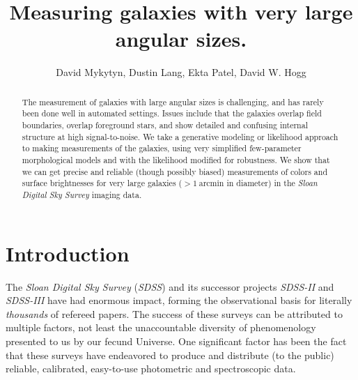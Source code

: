 \documentclass[12pt,preprint,pdftex]{aastex}
\newcounter{address}
\newcommand{\project}[1]{\textsl{#1}}
\newcommand{\units}[1]{\mathrm{#1}}
\renewcommand{\arcmin}{\units{arcmin}}
\begin{document}
\title{
       Measuring galaxies with very large angular sizes.
      }
\author{
        David Mykytyn\altaffilmark{\ref{CCPP}},
        Dustin Lang\altaffilmark{\ref{CMU}},
        Ekta Patel\altaffilmark{\ref{CCPP}},
        David W. Hogg\altaffilmark{\ref{CCPP},\ref{MPIA},\ref{email}}
       }
\setcounter{address}{1}

\begin{abstract}
The measurement of galaxies with large angular sizes is challenging,
and has rarely been done well in automated settings.  Issues include
that the galaxies overlap field boundaries, overlap foreground stars,
and show detailed and confusing internal structure at high
signal-to-noise.  We take a generative modeling or likelihood approach
to making measurements of the galaxies, using very simplified
few-parameter morphological models and with the likelihood modified
for robustness.  We show that we can get precise and reliable (though
possibly biased) measurements of colors and surface brightnesses for
very large galaxies ($>1~\arcmin$ in diameter) in the \project{Sloan
  Digital Sky Survey} imaging data.
\end{abstract}

\section{Introduction}

The \project{Sloan Digital Sky Survey} (\project{SDSS}) and its
successor projects \project{SDSS-II} and \project{SDSS-III} have had
enormous impact, forming the observational basis for literally
\emph{thousands} of refereed papers.  The success of these surveys can
be attributed to multiple factors, not least the unaccountable
diversity of phenomenology presented to us by our fecund Universe.
One significant factor has been the fact that these surveys have
endeavored to produce and distribute (to the public) reliable,
calibrated, easy-to-use photometric and spectroscopic data.
\end{document}
